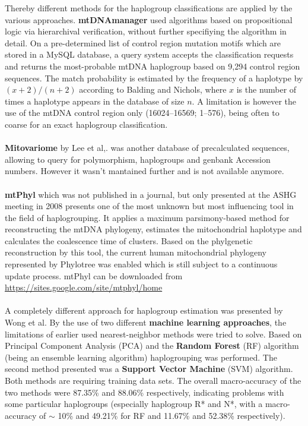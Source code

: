 Thereby different methods for the haplogroup classifications are applied by the various approaches. \textbf{mtDNAmanager} used algorithms based on propositional logic via hierarchival verification, without further specifiying the algorithm in detail. On a pre-determined list of control region mutation motifs which are stored in a MySQL database, a query system accepts the classification requests and returns the most-probable mtDNA haplogroup based on 9,294 control region sequences. The match probability is estimated by the frequency of a haplotype by $(x+2)/(n+2)$ according to Balding and Nichols\cite{Balding1994}, where $x$ is the number of times a haplotype appears in the database of size $n$. A limitation is however the use of the mtDNA control region only (16024–16569; 1–576), being often to coarse for an exact haplogroup classification.\\
\\
\textbf{Mitovariome} by Lee et al,. \cite{Lee2009} was another database of precalculated sequences, allowing to query for polymorphism, haplogroups and genbank Accession numbers. However it wasn't mantained further and is not available anymore.\\
\\
\textbf{mtPhyl}\label{mtphyl} which was not published in a journal, but only presented at the ASHG meeting in 2008 presents one of the most unknown but most influencing tool in the field of haplogrouping. It applies a maximum parsimony-based method for reconstructing the mtDNA phylogeny, estimates the mitochondrial haplotype and calculates the coalescence time of clusters. Based on the phylgenetic reconstruction by this tool, the current human mitochondrial phylogeny represented by Phylotree was enabled which is still subject to a continuous update process\cite{VanOven2015}. mtPhyl can be downloaded from \url{https://sites.google.com/site/mtphyl/home}\\ 
\\
A completely different approach for haplogroup estimation was presented by Wong et al.\cite{Wong2011} By the use of two different \textbf{machine learning approaches}, the limitations of earlier used nearest-neighbor methods were tried to solve. Based on Principal Component Analysis (PCA) and the\textbf{ Random Forest} (RF) algorithm (being an ensemble learning algorithm) haplogrouping was performed. The second method presented was a \textbf{Support Vector Machine} (SVM) algorithm. Both methods are requiring training data sets. The overall macro-accuracy of the two methods were 87.35\% and 88.06\% respectively, indicating problems with some particular haplogroups (especially haplogroup R* and N*, with a macro-accuracy of $\sim$ 10\% and 49.21\% for RF and 11.67\% and 52.38\% respectively). \\
